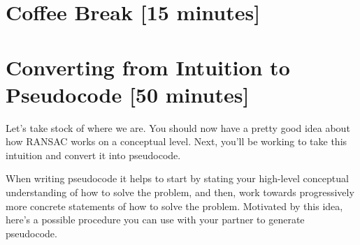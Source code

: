 \documentclass{tufte-handout}
\begin{document}
\section{Coffee Break [15 minutes]}

\section{Converting from Intuition to Pseudocode [50 minutes]}
Let's take stock of where we are.  You should now have a pretty good idea about how RANSAC works on a conceptual level.  Next, you'll be working to take this intuition and convert it into pseudocode.

When writing pseudocode it helps to start by stating your high-level conceptual understanding of how to solve the problem, and then, work towards progressively more concrete statements of how to solve the problem.  Motivated by this idea, here's a possible procedure you can use with your partner to generate pseudocode.
\end{document}
